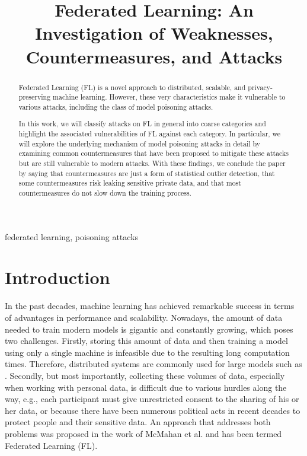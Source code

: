 \documentclass[conference]{IEEEtran}
\begin{document}
\title{Federated Learning: An Investigation of Weaknesses, Countermeasures, and Attacks}

\author{
}

\maketitle
 
\begin{abstract}
    Federated Learning (FL) is a novel approach to distributed, scalable, and privacy-preserving machine learning. However, these very characteristics make it vulnerable to various attacks, including the class of model poisoning attacks.
    
    In this work, we will classify attacks on FL in general into coarse categories and highlight the associated vulnerabilities of FL against each category. In particular, we will explore the underlying mechanism of model poisoning attacks in detail by examining common countermeasures that have been proposed to mitigate these attacks but are still vulnerable to modern attacks. With these findings, we conclude the paper by saying that countermeasures are just a form of statistical outlier detection, that some countermeasures risk leaking sensitive private data, and that most countermeasures do not slow down the training process.
\end{abstract}

\begin{IEEEkeywords}
federated learning, poisoning attacks
\end{IEEEkeywords}

\section{Introduction}\label{sec:intro}
In the past decades, machine learning has achieved remarkable success in terms of advantages in performance and scalability. Nowadays, the amount of data needed to train modern models is gigantic and constantly growing, which poses two challenges. Firstly, storing this amount of data and then training a model using only a single machine is infeasible due to the resulting long computation times. Therefore, distributed systems are commonly used for large models such as \cite{Devlin2019}. Secondly, but most importantly, collecting these volumes of data, especially when working with personal data, is difficult due to various hurdles along the way, e.g., each participant must give unrestricted consent to the sharing of his or her data, or because there have been numerous political acts in recent decades to protect people and their sensitive data. An approach that addresses both problems was proposed in the work of McMahan et al. \cite{McMahan2017} and has been termed Federated Learning (FL).
\end{document}
